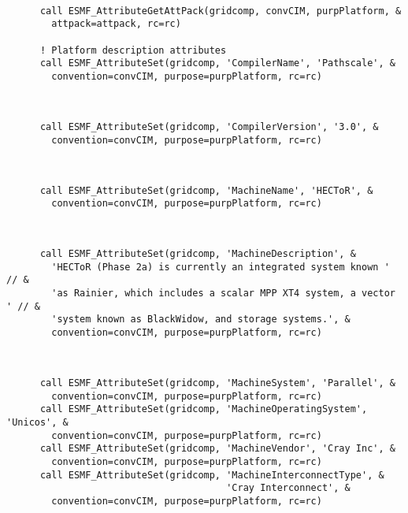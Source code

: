 
 \begin{verbatim}

      call ESMF_AttributeGetAttPack(gridcomp, convCIM, purpPlatform, &
        attpack=attpack, rc=rc)

      ! Platform description attributes
      call ESMF_AttributeSet(gridcomp, 'CompilerName', 'Pathscale', &
        convention=convCIM, purpose=purpPlatform, rc=rc)
 
\end{verbatim}
 

 \begin{verbatim}

      call ESMF_AttributeSet(gridcomp, 'CompilerVersion', '3.0', &
        convention=convCIM, purpose=purpPlatform, rc=rc)
 
\end{verbatim}
 

 \begin{verbatim}

      call ESMF_AttributeSet(gridcomp, 'MachineName', 'HECToR', &
        convention=convCIM, purpose=purpPlatform, rc=rc)
 
\end{verbatim}
 

 \begin{verbatim}

      call ESMF_AttributeSet(gridcomp, 'MachineDescription', &
        'HECToR (Phase 2a) is currently an integrated system known ' // &
        'as Rainier, which includes a scalar MPP XT4 system, a vector ' // &
        'system known as BlackWidow, and storage systems.', &
        convention=convCIM, purpose=purpPlatform, rc=rc)
 
\end{verbatim}
 

 \begin{verbatim}

      call ESMF_AttributeSet(gridcomp, 'MachineSystem', 'Parallel', &
        convention=convCIM, purpose=purpPlatform, rc=rc)
      call ESMF_AttributeSet(gridcomp, 'MachineOperatingSystem', 'Unicos', &
        convention=convCIM, purpose=purpPlatform, rc=rc)
      call ESMF_AttributeSet(gridcomp, 'MachineVendor', 'Cray Inc', &
        convention=convCIM, purpose=purpPlatform, rc=rc)
      call ESMF_AttributeSet(gridcomp, 'MachineInterconnectType', &
                                       'Cray Interconnect', &
        convention=convCIM, purpose=purpPlatform, rc=rc)
 
\end{verbatim}
 
